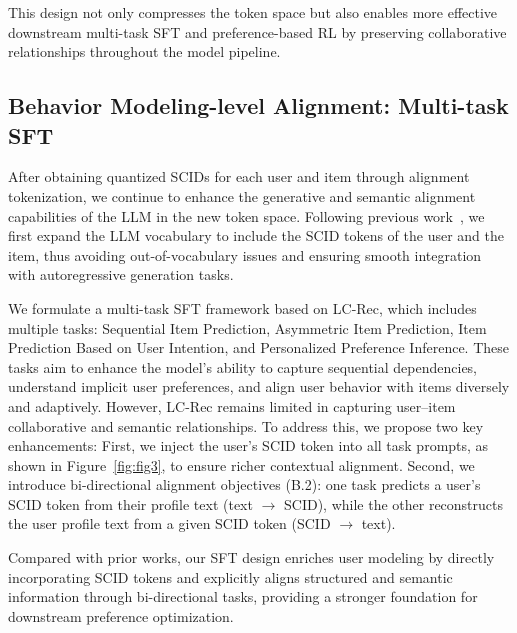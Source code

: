 \documentclass[letterpaper]{article} %
\begin{document}
%
This design not only compresses the token space but also enables more effective downstream multi-task SFT and preference-based RL by preserving collaborative relationships throughout the model pipeline.
%

%
\subsection{Behavior Modeling-level Alignment: Multi-task SFT}
After obtaining quantized SCIDs for each user and item through alignment tokenization, we continue to enhance the generative and semantic alignment capabilities of the LLM in the new token space. Following previous work~\cite{lc-rec}, we first expand the LLM vocabulary to include the SCID tokens of the user and the item, thus avoiding out-of-vocabulary issues and ensuring smooth integration with autoregressive generation tasks.
%

%
We formulate a multi-task SFT framework based on LC-Rec, which includes multiple tasks: Sequential Item Prediction, Asymmetric Item Prediction, Item Prediction Based on User Intention, and Personalized Preference Inference. These tasks aim to enhance the model’s ability to capture sequential dependencies, understand implicit user preferences, and align user behavior with items diversely and adaptively.
However, LC-Rec remains limited in capturing user–item collaborative and semantic relationships. To address this, we propose two key enhancements: First, we inject the user's SCID token into all task prompts, as shown in Figure~\ref{fig:fig3}, to ensure richer contextual alignment. Second, we introduce bi-directional alignment objectives (B.2): one task predicts a user's SCID token from their profile text (text $\to$ SCID), while the other reconstructs the user profile text from a given SCID token (SCID $\to$ text).
%

%
Compared with prior works, our SFT design enriches user modeling by directly incorporating SCID tokens and explicitly aligns structured and semantic information through bi-directional tasks, providing a stronger foundation for downstream preference optimization.
%

%
\end{document}
